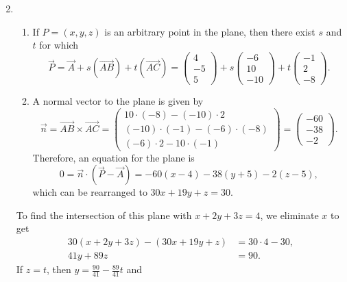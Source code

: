 \begin{enumerate}
\begin{enumerate}
\begin{equation*}
\end{equation*}
\end{enumerate}
\item \begin{enumerate}
\item If $P = (x,y,z)$ is an arbitrary point in the plane, then there exist $s$ and $t$ for which
\begin{equation*}
\overrightarrow{P} = \overrightarrow{A} + s(\overrightarrow{AB}) + t(\overrightarrow{AC}) = \begin{pmatrix} 4 \\ -5 \\ 5 \end{pmatrix} + s\begin{pmatrix} -6 \\ 10 \\ -10 \end{pmatrix} + t\begin{pmatrix} -1 \\ 2 \\ -8 \end{pmatrix}.
\end{equation*}
\item A normal vector to the plane is given by
\begin{equation*}
\vec{n} = \overrightarrow{AB}\times\overrightarrow{AC} = \begin{pmatrix} 10\cdot (-8) - (-10)\cdot 2 \\ (-10)\cdot (-1) - (-6)\cdot (-8) \\ (-6)\cdot 2 - 10\cdot (-1) \end{pmatrix} = \begin{pmatrix} -60 \\ -38 \\ -2 \end{pmatrix}.
\end{equation*}
Therefore, an equation for the plane is
\begin{equation*}
0 = \vec{n}\cdot (\overrightarrow{P} - \overrightarrow{A}) = -60(x - 4) - 38(y + 5) - 2(z - 5),
\end{equation*}
which can be rearranged to $30x + 19y + z = 30$.
\end{enumerate}
To find the intersection of this plane with $x + 2y + 3z = 4$, we eliminate $x$ to get
\begin{align*}
30(x + 2y + 3z) - (30x + 19y + z) &= 30\cdot 4 - 30, \\
41y + 89z &= 90.
\end{align*}
If $z = t$, then $\displaystyle y = \frac{90}{41} - \frac{89}{41}t$ and

\end{enumerate}

